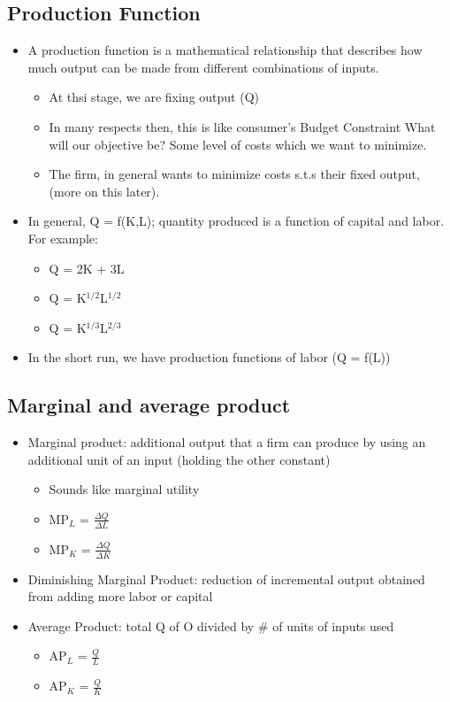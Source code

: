 \documentclass{article}
\begin{document}
\subsection{Production Function}
\begin{itemize}
  \item A production function is a mathematical relationship that describes how much output can be made from different
    combinations of inputs.
    \begin{itemize}
      \item At thsi stage, we are fixing output (Q)
      \item In many respects then, this is like consumer's Budget Constraint
        What will our objective be? Some level of costs which we want to minimize.
      \item The firm, in general wants to minimize costs s.t.s their fixed output, (more on this later).
    \end{itemize}
  \item In general, Q = f(K,L); quantity produced is a function of capital and labor. For example:
    \begin{itemize}
      \item Q = 2K + 3L
      \item Q = K$^{1/2}$L$^{1/2}$
      \item Q = K$^{1/3}$L$^{2/3}$
    \end{itemize}
  \item In the short run, we have production functions of labor (Q = f(L))
\end{itemize}

\subsection{Marginal and average product}
\begin{itemize}
  \item Marginal product: additional output that a firm can produce by using an additional unit of an input (holding the other constant)
    \begin{itemize}
      \item Sounds like marginal utility
      \item MP$_L$ = $\frac{\Delta Q}{\Delta L}$
      \item MP$_K$ = $\frac{\Delta Q}{\Delta K}$
    \end{itemize}
  \item Diminishing Marginal Product: reduction of incremental output
    obtained from adding more labor or capital
  \item Average Product: total Q of O divided by \# of units of inputs used
    \begin{itemize}
      \item AP$_L$ = $\frac{Q}{L}$
      \item AP$_K$ = $\frac{Q}{K}$
    \end{itemize}
\end{itemize}
\end{document}
